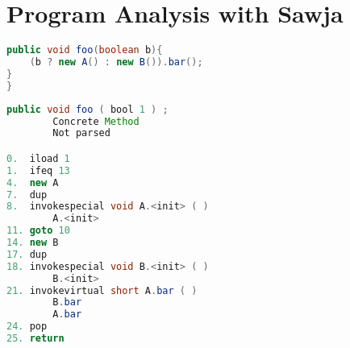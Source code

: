 \section{Program Analysis with Sawja}

\begin{lstlisting}[caption=Java sample.,language=Java]
public void foo(boolean b){
    (b ? new A() : new B()).bar();
}
}
\end{lstlisting}

\begin{lstlisting}[caption=Sawja sample.,language=Java]
public void foo ( bool 1 ) ;
		Concrete Method
    	Not parsed

0.  iload 1
1.  ifeq 13
4.  new A
7.  dup
8.  invokespecial void A.<init> ( )
        A.<init>
11. goto 10
14. new B
17. dup
18. invokespecial void B.<init> ( )
        B.<init>
21. invokevirtual short A.bar ( )
        B.bar
        A.bar
24. pop
25. return

\end{lstlisting}